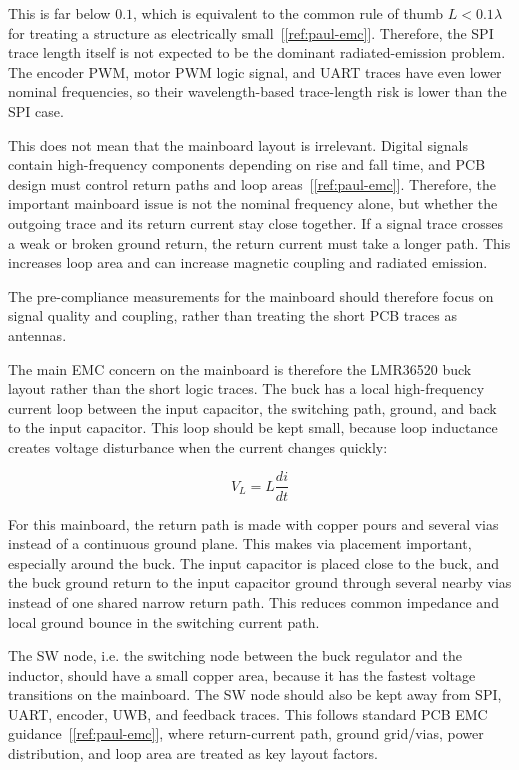 This is far below \(0.1\), which is equivalent to the common rule of thumb
\(L < 0.1\lambda\) for treating a structure as electrically small~[\ref{ref:paul-emc}].
Therefore, the SPI trace
length itself is not expected to be the dominant radiated-emission problem. The encoder
PWM, motor PWM logic signal, and UART traces have even lower nominal frequencies,
so their wavelength-based trace-length risk is lower than the SPI case.

This does not mean that the mainboard layout is irrelevant. Digital signals contain
high-frequency components depending on rise and fall time, and PCB design must
control return paths and loop areas~[\ref{ref:paul-emc}]. Therefore, the
important mainboard issue is not the nominal frequency alone, but whether the outgoing
trace and its return current stay close together. If a signal trace crosses a weak or broken
ground return, the return current must take a longer path. This increases loop area and
can increase magnetic coupling and radiated emission.

The pre-compliance measurements for the mainboard should therefore focus on signal
quality and coupling, rather than treating the short PCB traces as antennas. 


The main EMC concern on the mainboard is therefore the LMR36520 buck layout rather
than the short logic traces. The buck has a local high-frequency current loop between the
input capacitor, the switching path, ground, and back to the input capacitor. This loop
should be kept small, because loop inductance creates voltage disturbance when the current
changes quickly:

\begin{equation}
V_L = L \frac{di}{dt}
\end{equation}

For this mainboard, the return path is made with copper pours and several vias instead of
a continuous ground plane. This makes via placement important, especially around the
buck. The input capacitor is placed close to the buck, and the buck ground
return to the input capacitor ground through several nearby vias instead of one shared
narrow return path. This reduces common impedance and local ground bounce in the
switching current path.

The SW node, i.e. the switching node between the buck regulator and the inductor,
should have a small copper area, because it has the fastest voltage
transitions on the mainboard. The SW node should also be kept away from SPI, UART,
encoder, UWB, and feedback traces. This follows standard PCB EMC guidance~[\ref{ref:paul-emc}],
where return-current path, ground grid/vias, power distribution, and loop area are treated
as key layout factors.
